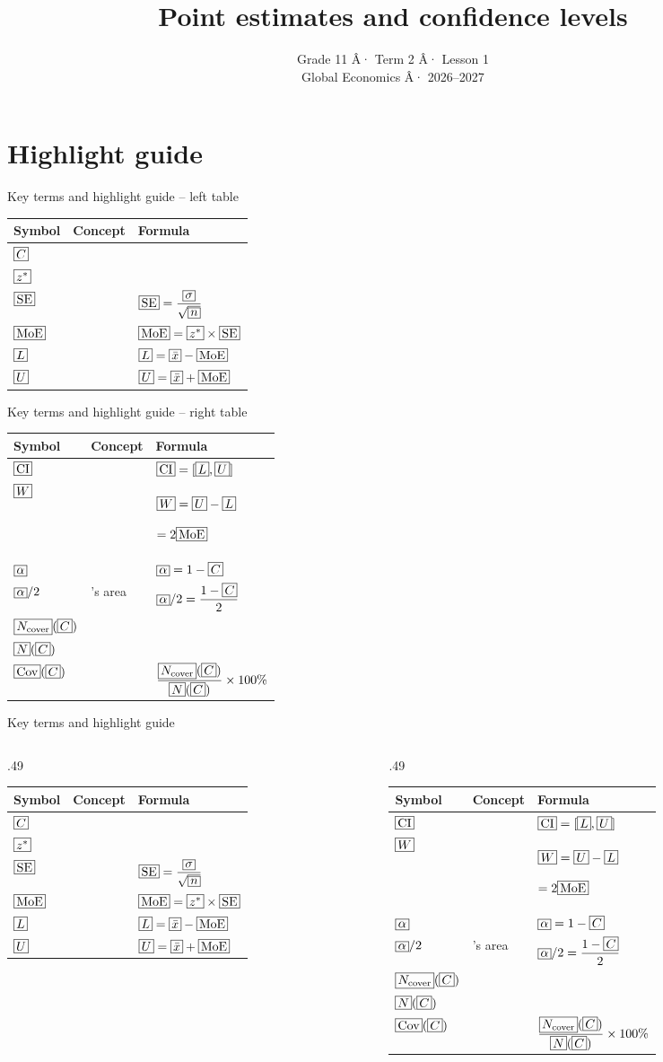 \documentclass[handout,12pt,aspectratio=169]{beamer}
\title{Point estimates and confidence levels}
\subtitle{Grade 11 Â· Term 2 Â· Lesson 1\\Global Economics Â· 2026--2027}
\author{}\date{}
\makeatletter
\renewcommand{\arraystretch}{1.22}
\newcommand{\GEHighlight}[2]{\begingroup\setlength{\fboxsep}{.6mm}\ifmmode\fbox{\ensuremath{#2}}\else\fbox{#2}\fi\endgroup}
\newcommand{\CtwoPoint}[1]{\GEHighlight{SampleMean}{#1}}
\newcommand{\CtwoSD}[1]{\GEHighlight{PopulationSD}{#1}}
\newcommand{\CtwoSize}[1]{\GEHighlight{SampleSize}{#1}}
\newcommand{\CtwoConfidence}[1]{\GEHighlight{Confidence}{#1}}
\newcommand{\CtwoSignificance}[1]{\GEHighlight{Confidence}{#1}}
\newcommand{\CtwoCritical}[1]{\GEHighlight{Critical}{#1}}
\newcommand{\CtwoSE}[1]{\GEHighlight{StandardError}{#1}}
\newcommand{\CtwoMoE}[1]{\GEHighlight{MarginError}{#1}}
\newcommand{\CtwoEndpoint}[1]{\GEHighlight{Endpoint}{#1}}
\newcommand{\CtwoCI}[1]{\GEHighlight{Endpoint}{#1}}
\newcommand{\CtwoWidth}[1]{\GEHighlight{Width}{#1}}
\newcommand{\CtwoCoverage}[1]{\GEHighlight{Coverage}{#1}}
\newcommand{\CtwoCoverCount}{\CtwoCoverage{N_{\rm cover}}}
\newcommand{\CtwoTotalCount}{\CtwoCoverage{N}}
\newcommand{\LegendStyle}{\fontsize{10.5}{12}\selectfont\setlength{\parskip}{0pt}\setlength{\tabcolsep}{2pt}\renewcommand{\arraystretch}{1.02}}
\newcommand{\LeftLegend}{\begingroup\LegendStyle\begin{tabularx}{\linewidth}{@{}>{\raggedright\arraybackslash}p{.28\linewidth}>{\raggedright\arraybackslash}p{.30\linewidth}>{\raggedright\arraybackslash}X@{}}
\toprule
\textbf{Symbol} & \textbf{Concept} & \textbf{Formula} \\
\midrule
$\CtwoConfidence{C}$ & \CtwoConfidence{Confidence} \CtwoConfidence{level} &  \\[2pt]
$\CtwoCritical{z^*}$ & \CtwoCritical{Critical} \CtwoCritical{value} &  \\[2pt]
$\CtwoSE{\mathrm{SE}}$ & \CtwoSE{Standard} \CtwoSE{error} & $\CtwoSE{\mathrm{SE}}=\dfrac{\CtwoSD{\sigma}}{\sqrt{\CtwoSize{n}}}$ \\[2pt]
$\CtwoMoE{\mathrm{MoE}}$ & \CtwoMoE{Margin} \CtwoMoE{of} \CtwoMoE{error} & $\CtwoMoE{\mathrm{MoE}}=\CtwoCritical{z^*}\times\CtwoSE{\mathrm{SE}}$ \\[2pt]
$\CtwoEndpoint{L}$ & \CtwoEndpoint{Lower} \CtwoEndpoint{endpoint} & $\CtwoEndpoint{L}=\CtwoPoint{\bar{x}}-\CtwoMoE{\mathrm{MoE}}$ \\[2pt]
$\CtwoEndpoint{U}$ & \CtwoEndpoint{Upper} \CtwoEndpoint{endpoint} & $\CtwoEndpoint{U}=\CtwoPoint{\bar{x}}+\CtwoMoE{\mathrm{MoE}}$ \\[2pt]
\bottomrule
\end{tabularx}\par\endgroup}
\newcommand{\RightLegend}{\begingroup\LegendStyle\begin{tabularx}{\linewidth}{@{}>{\raggedright\arraybackslash}p{.28\linewidth}>{\raggedright\arraybackslash}p{.30\linewidth}>{\raggedright\arraybackslash}X@{}}
\toprule
\textbf{Symbol} & \textbf{Concept} & \textbf{Formula} \\
\midrule
$\CtwoCI{\mathrm{CI}}$ & \CtwoCI{Confidence} \CtwoCI{interval} & $\CtwoCI{\mathrm{CI}}=[\CtwoEndpoint{L},\CtwoEndpoint{U}]$ \\[2pt]
$\CtwoWidth{W}$ & \CtwoWidth{Full} \CtwoWidth{width} & $\CtwoWidth{W}=\CtwoEndpoint{U}-\CtwoEndpoint{L}$\par$=2\CtwoMoE{\mathrm{MoE}}$ \\[2pt]
$\CtwoSignificance{\alpha}$ & \CtwoSignificance{Significance} \CtwoSignificance{level} & $\CtwoSignificance{\alpha}=1-\CtwoConfidence{C}$ \\[2pt]
$\CtwoSignificance{\alpha}/2$ & \CtwoSignificance{Each} \CtwoSignificance{tail}'s area & $\CtwoSignificance{\alpha}/2=\dfrac{1-\CtwoConfidence{C}}{2}$ \\[2pt]
$\CtwoCoverCount(\CtwoConfidence{C})$ & \CtwoCoverage{Covering} \CtwoCoverage{count} &  \\[2pt]
$\CtwoTotalCount(\CtwoConfidence{C})$ & \CtwoCoverage{Total} \CtwoCoverage{interval} \CtwoCoverage{count} &  \\[2pt]
$\CtwoCoverage{\mathrm{Cov}}(\CtwoConfidence{C})$ & \CtwoCoverage{Observed} \CtwoCoverage{coverage} & $\dfrac{\CtwoCoverCount(\CtwoConfidence{C})}{\CtwoTotalCount(\CtwoConfidence{C})}\times100\%$ \\[2pt]
\bottomrule
\end{tabularx}\par\endgroup}
\newcommand{\BothLegends}{\begin{columns}[T,onlytextwidth]
\begin{column}{.49\textwidth}\LeftLegend\end{column}
\begin{column}{.49\textwidth}\RightLegend\end{column}\end{columns}}
\makeatother
\begin{document}
\section{Highlight guide}\begin{frame}\titlepage\end{frame}
\begin{frame}[t]{Key terms and highlight guide -- left table}
\begin{minipage}{.76\linewidth}\LeftLegend\end{minipage}
\end{frame}
\begin{frame}[t]{Key terms and highlight guide -- right table}
\begin{minipage}{.76\linewidth}\RightLegend\end{minipage}
\end{frame}
\begin{frame}[t]{Key terms and highlight guide}
\BothLegends
\end{frame}
\end{document}
